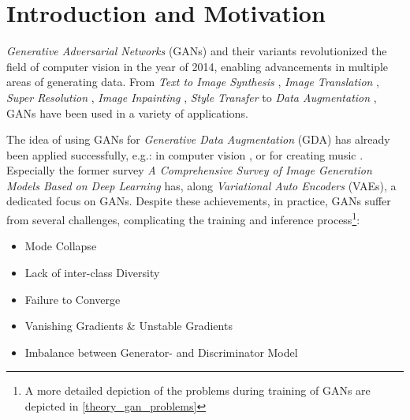 \section{Introduction and Motivation}\label{introduction_and_motivation}
\pagestyle{fancy}
\textit{Generative Adversarial Networks} (GANs) \cite{goodfellow2014generativeadversarialnetworks} and their variants revolutionized the field of computer vision in the year of 2014, enabling advancements in multiple areas of generating data. From \textit{Text to Image Synthesis} \cite{reed2016generativeadversarialtextimage}, \textit{Image Translation} \cite{isola2018imagetoimagetranslationconditionaladversarial}, \textit{Super Resolution} \cite{ledig2017photorealisticsingleimagesuperresolution}, \textit{Image Inpainting} \cite{pathak2016contextencodersfeaturelearning}, \textit{Style Transfer} \cite{wang2023multimodalityguidedimagestyletransfer} to \textit{Data Augmentation} \cite{shorten2019survey}, GANs have been used in a variety of applications.

The idea of using GANs for \textit{Generative Data Augmentation} (GDA) has already been applied successfully, e.g.: in computer vision \cite{Li2025comprehensivesurvedeepimages}, \cite{biswas2023generativeadversarialnetworksdata} or for creating music \cite{ji2020comprehensivesurveydeepmusic}. Especially the former survey \textit{A Comprehensive Survey of Image Generation Models Based on Deep Learning} has, along \textit{Variational Auto Encoders} (VAEs), a dedicated focus on GANs. Despite these achievements, in practice, GANs suffer from several challenges, complicating the training and inference process\footnote{A more detailed depiction of the problems during training of GANs are depicted in \ref{theory_gan_problems}}:

\begin{itemize}\label{problems_of_gans}
    \setlength{\itemsep}{-5pt}
    \item Mode Collapse
    \item Lack of inter-class Diversity
    \item Failure to Converge
    \item Vanishing Gradients \& Unstable Gradients
    \item Imbalance between Generator- and Discriminator Model
\end{itemize}

